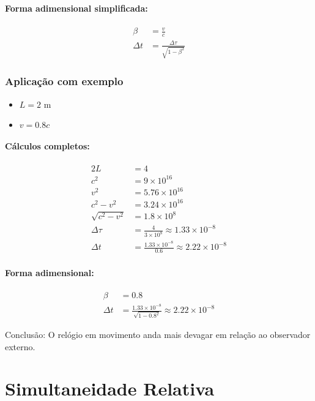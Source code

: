 \documentclass[12pt,a4paper]{article}
\begin{document}
\paragraph{Forma adimensional simplificada:}
\begin{align*}
\beta &= \frac{v}{c} \\
\Delta t &= \frac{\Delta \tau}{\sqrt{1 - \beta^2}}
\end{align*}

\subsubsection*{Aplicação com exemplo}

\begin{itemize}
    \item $L = 2$ m
    \item $v = 0.8 c$
\end{itemize}

\paragraph{Cálculos completos:}
\begin{align*}
2L &= 4 \\
c^2 &= 9 \times 10^{16} \\
v^2 &= 5.76 \times 10^{16} \\
c^2 - v^2 &= 3.24 \times 10^{16} \\
\sqrt{c^2 - v^2} &= 1.8 \times 10^8 \\
\Delta \tau &= \frac{4}{3\times 10^8} \approx 1.33 \times 10^{-8} \\
\Delta t &= \frac{1.33 \times 10^{-8}}{0.6} \approx 2.22 \times 10^{-8}
\end{align*}

\paragraph{Forma adimensional:}
\begin{align*}
\beta &= 0.8 \\
\Delta t &= \frac{1.33 \times 10^{-8}}{\sqrt{1 - 0.8^2}} \approx 2.22 \times 10^{-8}
\end{align*}

Conclusão: O relógio em movimento anda mais devagar em relação ao observador externo.

\section{Simultaneidade Relativa}
\end{document}
